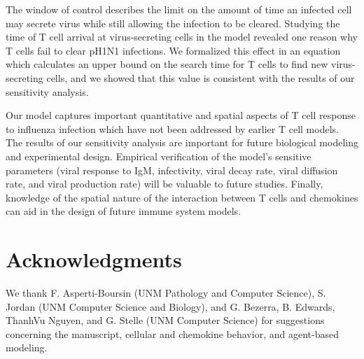 \documentclass[preprint,10pt,authoryear]{elsarticle}
\begin{document}
The window of control describes the limit on the amount of time an infected cell may secrete virus while still allowing the infection to be cleared.  Studying the time of T cell arrival at virus-secreting cells in the model revealed one reason why T cells fail to clear pH1N1 infections.  We formalized this effect in an equation which calculates an upper bound on the search time for T cells to find new virus-secreting cells, and we showed that this value is consistent with the results of our sensitivity analysis.

Our model captures important quantitative and spatial aspects of T cell response to influenza infection which have not been addressed by earlier T cell models.  The results of our sensitivity analysis are important for future biological modeling and experimental design.  Empirical verification of the model's sensitive parameters (viral response to IgM, infectivity, viral decay rate, viral diffusion rate, and viral production rate) will be valuable to future studies.  Finally, knowledge of the spatial nature of the interaction between T cells and chemokines can aid in the design of future immune system models.









\section*{Acknowledgments}

We thank F. Asperti-Boursin (UNM Pathology and Computer Science), S. Jordan (UNM Computer Science and Biology), and G. Bezerra, B. Edwards, ThanhVu Nguyen, and G. Stelle (UNM Computer Science) for suggestions concerning the manuscript, cellular and chemokine behavior, and agent-based modeling.
\end{document}
